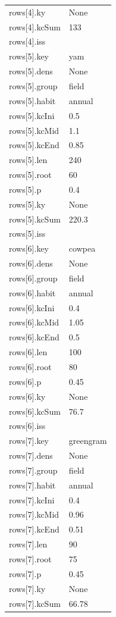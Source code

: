 {\begin{longtable}{p{}p{}}
{}rows[4].ky & None\\
{}rows[4].kcSum & 133\\
{}rows[4].iss & \\
{}rows[5].key & yam\\
{}rows[5].dens & None\\
{}rows[5].group & field\\
{}rows[5].habit & annual\\
{}rows[5].kcIni & 0.5\\
{}rows[5].kcMid & 1.1\\
{}rows[5].kcEnd & 0.85\\
{}rows[5].len & 240\\
{}rows[5].root & 60\\
{}rows[5].p & 0.4\\
{}rows[5].ky & None\\
{}rows[5].kcSum & 220.3\\
{}rows[5].iss & \\
{}rows[6].key & cowpea\\
{}rows[6].dens & None\\
{}rows[6].group & field\\
{}rows[6].habit & annual\\
{}rows[6].kcIni & 0.4\\
{}rows[6].kcMid & 1.05\\
{}rows[6].kcEnd & 0.5\\
{}rows[6].len & 100\\
{}rows[6].root & 80\\
{}rows[6].p & 0.45\\
{}rows[6].ky & None\\
{}rows[6].kcSum & 76.7\\
{}rows[6].iss & \\
{}rows[7].key & greengram\\
{}rows[7].dens & None\\
{}rows[7].group & field\\
{}rows[7].habit & annual\\
{}rows[7].kcIni & 0.4\\
{}rows[7].kcMid & 0.96\\
{}rows[7].kcEnd & 0.51\\
{}rows[7].len & 90\\
{}rows[7].root & 75\\
{}rows[7].p & 0.45\\
{}rows[7].ky & None\\
{}rows[7].kcSum & 66.78\\

\end{longtable}}
